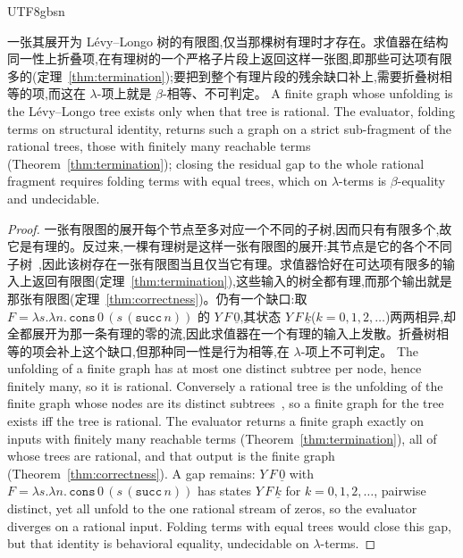 \begin{CJK*}{UTF8}{gbsn}
  \begin{theorem}\label{thm:ceiling}
    \ifTablambdaChinese
    一张其展开为 Lévy--Longo 树的有限图,仅当那棵树有理时才存在。求值器在结构同一性上折叠项,在有理树的一个严格子片段上返回这样一张图,即那些可达项有限多的(定理~\ref{thm:termination});要把到整个有理片段的残余缺口补上,需要折叠树相等的项,而这在 $\lambda$-项上就是 $\beta$-相等、不可判定。
    \else
    A finite graph whose unfolding is the L\'evy--Longo tree exists only when that tree is rational. The evaluator, folding terms on structural identity, returns such a graph on a strict sub-fragment of the rational trees, those with finitely many reachable terms (Theorem~\ref{thm:termination}); closing the residual gap to the whole rational fragment requires folding terms with equal trees, which on $\lambda$-terms is $\beta$-equality and undecidable.
    \fi
  \end{theorem}
  \begin{proof}
    \ifTablambdaChinese
    一张有限图的展开每个节点至多对应一个不同的子树,因而只有有限多个,故它是有理的。反过来,一棵有理树是这样一张有限图的展开:其节点是它的各个不同子树~\cite{courcelle1983-infinite-trees},因此该树存在一张有限图当且仅当它有理。求值器恰好在可达项有限多的输入上返回有限图(定理~\ref{thm:termination}),这些输入的树全都有理,而那个输出就是那张有限图(定理~\ref{thm:correctness})。仍有一个缺口:取 $F = \lambda s.\lambda n.\,\mathtt{cons}\,0\,(s\,(\mathtt{succ}\,n))$ 的 $Y\,F\,\underline{0}$,其状态 $Y\,F\,\underline{k}$($k = 0, 1, 2, \dots$)两两相异,却全都展开为那一条有理的零的流,因此求值器在一个有理的输入上发散。折叠树相等的项会补上这个缺口,但那种同一性是行为相等,在 $\lambda$-项上不可判定。
    \else
    The unfolding of a finite graph has at most one distinct subtree per node, hence finitely many, so it is rational. Conversely a rational tree is the unfolding of the finite graph whose nodes are its distinct subtrees~\cite{courcelle1983-infinite-trees}, so a finite graph for the tree exists iff the tree is rational. The evaluator returns a finite graph exactly on inputs with finitely many reachable terms (Theorem~\ref{thm:termination}), all of whose trees are rational, and that output is the finite graph (Theorem~\ref{thm:correctness}). A gap remains: $Y\,F\,\underline{0}$ with $F = \lambda s.\lambda n.\,\mathtt{cons}\,0\,(s\,(\mathtt{succ}\,n))$ has states $Y\,F\,\underline{k}$ for $k = 0, 1, 2, \dots$, pairwise distinct, yet all unfold to the one rational stream of zeros, so the evaluator diverges on a rational input. Folding terms with equal trees would close this gap, but that identity is behavioral equality, undecidable on $\lambda$-terms.
    \fi
  \end{proof}


\end{CJK*}
